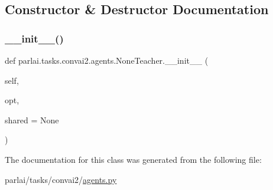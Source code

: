 \subsection{Constructor \& Destructor Documentation}
\mbox{\label{classparlai_1_1tasks_1_1convai2_1_1agents_1_1NoneTeacher_ab4fbfba45b52e37ca3293273880b56e6}} 
\subsubsection{\texorpdfstring{\+\_\+\+\_\+init\+\_\+\+\_\+()}{\_\_init\_\_()}}
{\footnotesize\ttfamily def parlai.\+tasks.\+convai2.\+agents.\+None\+Teacher.\+\_\+\+\_\+init\+\_\+\+\_\+ (\begin{DoxyParamCaption}\item[{}]{self,  }\item[{}]{opt,  }\item[{}]{shared = {\ttfamily None} }\end{DoxyParamCaption})}



The documentation for this class was generated from the following file\+:\begin{DoxyCompactItemize}
\item 
parlai/tasks/convai2/\hyperlink{parlai_2tasks_2convai2_2agents_8py}{agents.\+py}\end{DoxyCompactItemize}
